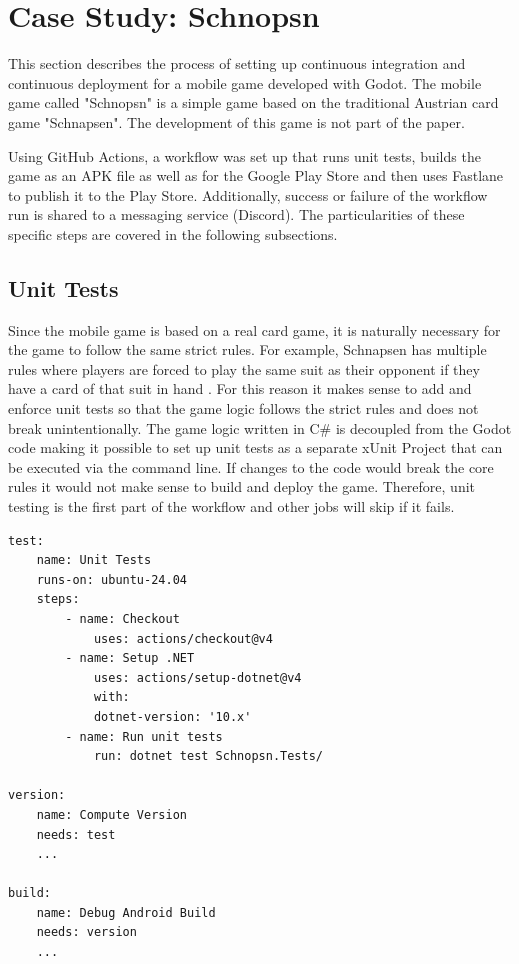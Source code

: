 \section{Case Study: Schnopsn}
This section describes the process of setting up continuous integration and continuous deployment for a mobile game developed with Godot. The mobile game called "Schnopsn" is a simple game based on the traditional Austrian card game "Schnapsen". The development of this game is not part of the paper.

Using GitHub Actions, a workflow was set up that runs unit tests, builds the game as an APK file as well as for the Google Play Store and then uses Fastlane to publish it to the Play Store. Additionally, success or failure of the workflow run is shared to a messaging service (Discord). The particularities of these specific steps are covered in the following subsections.

\subsection{Unit Tests}

Since the mobile game is based on a real card game, it is naturally necessary for the game to follow the same strict rules. For example, Schnapsen has multiple rules where players are forced to play the same suit as their opponent if they have a card of that suit in hand \cite{b4}.
For this reason it makes sense to add and enforce unit tests so that the game logic follows the strict rules and does not break unintentionally. The game logic written in C\# is decoupled from the Godot code making it possible to set up unit tests as a separate xUnit Project that can be executed via the command line. If changes to the code would break the core rules it would not make sense to build and deploy the game. Therefore, unit testing is the first part of the workflow and other jobs will skip if it fails.

    {\small\begin{verbatim}
test:
    name: Unit Tests
    runs-on: ubuntu-24.04
    steps:
        - name: Checkout
            uses: actions/checkout@v4
        - name: Setup .NET
            uses: actions/setup-dotnet@v4
            with:
            dotnet-version: '10.x'
        - name: Run unit tests
            run: dotnet test Schnopsn.Tests/

version:
    name: Compute Version
    needs: test
    ...

build:
    name: Debug Android Build
    needs: version
    ...
\end{verbatim}}


